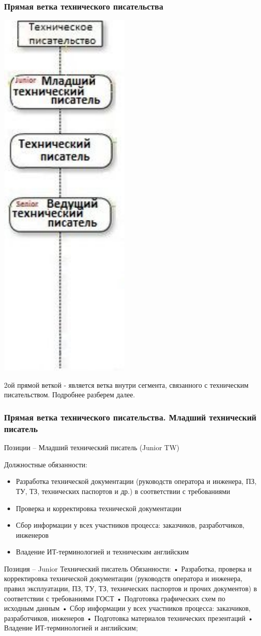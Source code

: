 \documentclass{../industrial-development}
\begin{document}
\begin{frame} \frametitle{Прямая ветка технического писательства }
  \centerline{\includegraphics[width=0.27\linewidth]{11-IT-specialist's-way/sch12b.pdf}}
\end{frame}

\lecturenotes
 2ой прямой веткой  - является ветка внутри сегмента, связанного с техническим писательством. Подробнее разберем далее.


\begin{frame} \frametitle{Прямая ветка технического писательства. Младший технический писатель }
  \begin{block}{}
  \alert{Позиции – Младший технический писатель (Junior TW) }

Должностные обязанности: 
  \end{block}
  \begin{itemize}
  \item  Разработка технической документации (руководств оператора и инженера, ПЗ, ТУ, ТЗ, технических паспортов и др.) в соответствии с требованиями
  \item  Проверка и корректировка технической документации
  \item Сбор информации у всех участников процесса: заказчиков, разработчиков, инженеров
 \item Владение ИТ-терминологией и техническим английским
  \end{itemize}
\end{frame}


\lecturenotes
Позиция – Junior Технический писатель
Обязанности:
•	Разработка, проверка и корректировка технической документации (руководств оператора и инженера, правил эксплуатации, ПЗ, ТУ, ТЗ, технических паспортов и прочих документов) в соответствии с требованиями ГОСТ 
•	Подготовка графических схем по исходным данным
•	Сбор информации у всех участников процесса: заказчиков, разработчиков, инженеров
•	Подготовка материалов технических презентаций
•	Владение ИТ-терминологией и английским;
\end{document}
